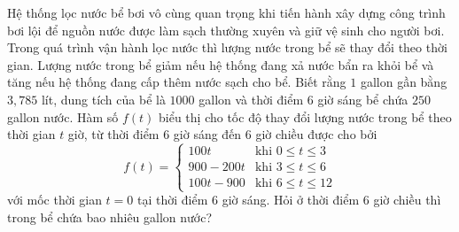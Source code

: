 \begin{ex}
Hệ thống lọc nước bể bơi vô cùng quan trọng khi tiến hành xây dựng công trình bơi lội để nguồn nước được làm sạch thường xuyên và giữ vệ sinh cho người bơi. Trong quá trình vận hành lọc nước thì lượng nước trong bể sẽ thay đổi theo thời gian. Lượng nước trong bể giảm nếu hệ thống đang xả nước bẩn ra khỏi bể và tăng nếu hệ thống đang cấp thêm nước sạch cho bể. Biết rằng $1$ gallon gần bằng $3{,}785$ lít, dung tích của bể là $1000$ gallon và thời điểm $6$ giờ sáng bể chứa $250$ gallon nước. Hàm số $f(t)$ biểu thị cho tốc độ thay đổi lượng nước trong bể theo thời gian $t$ giờ, từ thời điểm $6$ giờ sáng đến $6$ giờ chiều được cho bởi
\[f(t)=\begin{cases}100t&\text{khi }0\le t\le3\\900-200t&\text{khi }3\le t\le6\\100t-900&\text{khi }6\le t\le12\end{cases}\]
với mốc thời gian $t=0$ tại thời điểm $6$ giờ sáng. Hỏi ở thời điểm $6$ giờ chiều thì trong bể chứa bao nhiêu gallon nước?
\end{ex}
